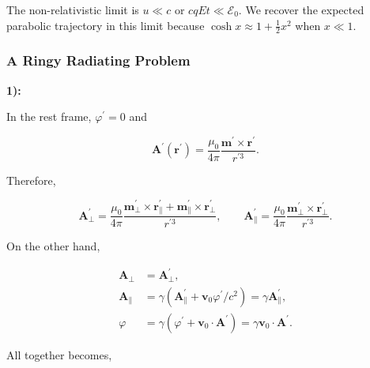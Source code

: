 The non-relativistic limit is $u \ll c$ or $c q E t \ll \mathcal{E}_{0}$. We recover the expected parabolic trajectory in this limit because $\cosh x \approx 1+\frac{1}{2} x^{2}$ when $x \ll 1$.

\subsubsection{A Ringy Radiating Problem}\label{A Ringy Radiating Problem}

\textbf{1):}

In the rest frame, $\varphi^{\prime}=0$ and

\begin{equation}
	\mathbf{A}^{\prime}\left(\mathbf{r}^{\prime}\right)=\frac{\mu_{0}}{4 \pi} \frac{\mathbf{m}^{\prime} \times \mathbf{r}^{\prime}}{r^{\prime 3}}.
\end{equation}

Therefore,

\begin{equation}
	\mathbf{A}_{\perp}^{\prime}=\frac{\mu_{0}}{4 \pi} \frac{\mathbf{m}_{\perp}^{\prime} \times \mathbf{r}_{\|}^{\prime}+\mathbf{m}_{\|}^{\prime} \times \mathbf{r}_{\perp}^{\prime}}{r^{\prime 3}}, \quad \quad \mathbf{A}_{\|}^{\prime}=\frac{\mu_{0}}{4 \pi} \frac{\mathbf{m}_{\perp}^{\prime} \times \mathbf{r}_{\perp}^{\prime}}{r^{\prime 3}} .
\end{equation}

On the other hand,

\begin{equation}
	\begin{split}
		\mathbf{A}_{\perp}&=\mathbf{A}_{\perp}^{\prime}, \\
		\mathbf{A}_{\|}&=\gamma\left(\mathbf{A}_{\|}^{\prime}+\mathbf{v}_{0} \varphi^{\prime} / c^{2}\right)=\gamma \mathbf{A}_{\|}^{\prime}, \\
		\varphi&=\gamma\left(\varphi^{\prime}+\mathbf{v}_{0} \cdot \mathbf{A}^{\prime}\right)=\gamma \mathbf{v}_{0} \cdot \mathbf{A}^{\prime} .
	\end{split}
\end{equation}

All together becomes,

